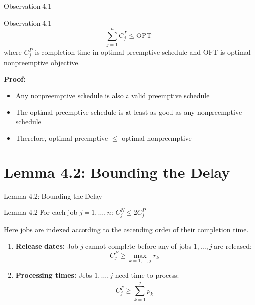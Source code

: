 \documentclass[aspectratio=169, 12pt]{beamer}
\begin{document}
\begin{frame}{Observation 4.1}
    \begin{block}{Observation 4.1}
    $$\sum_{j=1}^{n} C_j^P \leq \text{OPT}$$
        where $C_j^P$ is completion time in optimal preemptive schedule and OPT is optimal nonpreemptive objective.
    \end{block}

    \vspace{0.5cm}
    \textbf{Proof:}
    \begin{itemize}
        \item<2-> Any nonpreemptive schedule is also a valid preemptive schedule
        \item<3-> The optimal preemptive schedule is at least as good as any nonpreemptive schedule
        \item<4-> Therefore, optimal preemptive $\leq$ optimal nonpreemptive
    \end{itemize}
\end{frame}

\section{Lemma 4.2: Bounding the Delay}

\begin{frame}{Lemma 4.2: Bounding the Delay}
    \begin{block}{Lemma 4.2}
        For each job $j = 1, \ldots, n$: \quad $C_j^N \leq 2C_j^P$ \\
    \end{block}
    Here jobs are indexed according to the ascending order of their completion time.

    \vspace{0.3cm}

    \begin{enumerate}
        \item<3-> \textbf{Release dates:} Job $j$ cannot complete before any of jobs $1, \ldots, j$ are released:
        $$C_j^P \geq \max_{k=1,\ldots,j} r_k$$
        
        \item<4-> \textbf{Processing times:} Jobs $1, \ldots, j$ need time to process:
        $$C_j^P \geq \sum_{k=1}^{j} p_k$$
    \end{enumerate}
\end{frame}
\end{document}
